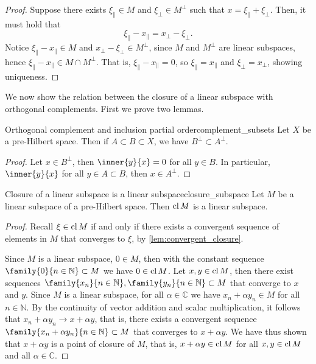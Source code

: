 \begin{proof}
    Suppose there exists \(\xi_\parallel \in M\) and \(\xi_\perp \in M^\perp\) such that \(x = \xi_\parallel + \xi_\perp\). Then, it must hold that
    \begin{equation*}
        \xi_\parallel - x_\parallel = x_\perp - \xi_\perp.
    \end{equation*}
    Notice \(\xi_\parallel - x_\parallel \in M\) and \(x_\perp - \xi_\perp \in M^\perp\), since \(M\) and \(M^\perp\) are linear subspaces, hence \(\xi_\parallel - x_\parallel \in M \cap M^\perp\). That is, \(\xi_\parallel - x_\parallel = 0\), so \(\xi_\parallel = x_\parallel\) and \(\xi_\perp = x_\perp\), showing uniqueness.
\end{proof}

We now show the relation between the closure of a linear subspace with orthogonal complements. First we prove two lemmas.
\begin{lemma}{Orthogonal complement and inclusion partial order}{complement_subsets}
    Let \(X\) be a pre-Hilbert space. Then if \(A \subset B \subset X\), we have \(B^\perp \subset A^\perp\).
\end{lemma}
\begin{proof}
    Let \(x \in B^\perp\), then \(\inner{y}{x} = 0\) for all \(y \in B\). In particular, \(\inner{y}{x}\) for all \(y \in A \subset B\), then \(x \in A^\perp\).
\end{proof}

\begin{lemma}{Closure of a linear subspace is a linear subspace}{closure_subspace}
    Let \(M\) be a linear subspace of a pre-Hilbert space. Then \(\operatorname{cl}{M}\) is a linear subspace.
\end{lemma}
\begin{proof}
    Recall \(\xi \in \operatorname{cl}{M}\) if and only if there exists a convergent sequence of elements in \(M\) that converges to \(\xi\), by \cref{lem:convergent_closure}.

    Since \(M\) is a linear subspace, \(0 \in M\), then with the constant sequence \(\family{0}{n\in \mathbb{N}} \subset M\) we have \(0 \in \operatorname{cl}{M}\). Let \(x, y \in \operatorname{cl}{M}\), then there exist sequences \(\family{x_n}{n\in \mathbb{N}}, \family{y_n}{n\in \mathbb{N}} \subset M\) that converge to \(x\) and \(y\). Since \(M\) is a linear subspace, for all \(\alpha \in \mathbb{C}\) we have \(x_n + \alpha y_n \in M\) for all \(n \in \mathbb{N}\). By the continuity of vector addition and scalar multiplication, it follows that \(x_n + \alpha y_n \to x + \alpha y\), that is, there exists a convergent sequence \(\family{x_n + \alpha y_n}{n \in \mathbb{N}}\subset M\) that converges to \(x + \alpha y\). We have thus shown that \(x + \alpha y\) is a point of closure of \(M\), that is, \(x + \alpha y \in \operatorname{cl}{M}\) for all \(x, y \in \operatorname{cl}{M}\) and all \(\alpha \in \mathbb{C}\).
\end{proof}


